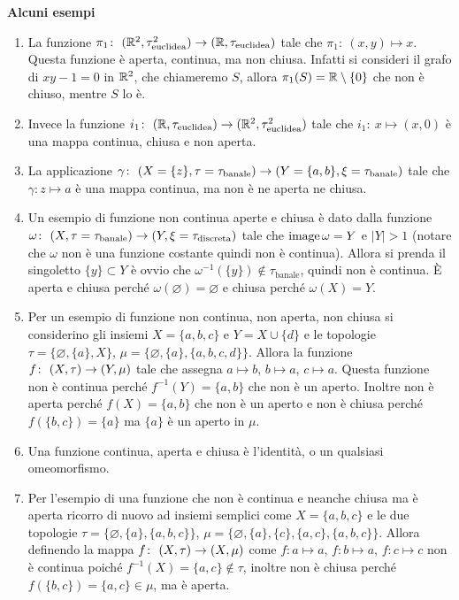 \textbf{Alcuni esempi}
\begin{enumerate}
	\item La funzione $\pi_1 \colon\ (\mathbb{R}^2,\tau^2_{\text{euclidea}}) \rightarrow (\mathbb{R},\tau_{\text{euclidea}})$ tale che $\pi_1 \colon\ (x,y) \mapsto x$. Questa funzione è aperta, continua, ma non chiusa. Infatti si consideri il grafo di $xy - 1 = 0$ in $\mathbb{R}^2$, che chiameremo $S$, allora $\pi_1(S) = \mathbb{R} \setminus \{0\}$ che non è chiuso, mentre $S$ lo è.
	\item Invece la funzione $i_1 \colon\ (\mathbb{R},\tau_{\text{euclidea}}) \rightarrow (\mathbb{R}^2,\tau^2_{\text{euclidea}})$ tale che $i_1 \colon\ x \mapsto (x,0)$ è una mappa continua, chiusa e non aperta. 
	\item La applicazione $\gamma \colon\ (X = \{z\},\tau =\tau_{\text{banale}}) \rightarrow (Y = \{a,b\},\xi = \tau_{\text{banale}})$ tale che  $\gamma \colon z \mapsto a$ è una mappa continua, ma non è ne aperta ne chiusa.
	\item Un esempio di funzione non continua aperte e chiusa è dato dalla funzione $\omega \colon\ (X,\tau =\tau_{\text{banale}}) \rightarrow (Y,\xi = \tau_{\text{discreta}})$ tale che $\operatorname{image}{\omega} = Y$ e $|Y| > 1$ (notare che $\omega$ non è una funzione costante quindi non è continua). Allora si prenda il singoletto $\{y\} \subset Y$ è ovvio che $\omega^{-1}(\{y\}) \notin \tau_{\text{banale}}$, quindi non è continua. È aperta e chiusa perché $\omega(\varnothing) = \varnothing$ e chiusa perché $\omega(X) = Y$.
	\item Per un esempio di funzione non continua, non aperta, non chiusa si considerino gli insiemi $X = \{a,b,c\}$ e $Y = X \cup \{d\}$ e le topologie $\tau = \{\varnothing, \{a\}, X\}$, $\mu = \{ \varnothing, \{a\}, \{a,b,c,d\}\}$. Allora la funzione $f \colon\ (X,\tau) \rightarrow (Y,\mu)$ tale che assegna $a \mapsto b$, $b \mapsto a$, $c \mapsto a$. Questa funzione non è continua perché $f^{-1}(Y) = \{a,b\}$ che non è un aperto. Inoltre non è aperta perché $f(X) = \{a,b\}$ che non è un aperto e non è chiusa perché $f(\{b,c\}) = \{a\}$ ma $\{a\}$ è un aperto in $\mu$.
	\item Una funzione continua, aperta e chiusa è l'identità, o un qualsiasi omeomorfismo.
	\item Per l'esempio di una funzione che non è continua e neanche chiusa ma è aperta ricorro di nuovo ad insiemi semplici come $X = \{a,b,c\}$ e le due topologie $\tau = \{\varnothing, \{a\},\{a,b,c\}\}$, $\mu = \{\varnothing, \{a\}, \{c\}, \{a,c\}, \{a,b,c\}\}$. Allora definendo la mappa $f \colon\ (X,\tau) \rightarrow (X,\mu)$ come $f \colon a \mapsto a$, $f \colon b \mapsto a$, $f \colon c \mapsto c$ non è continua poiché $f^{-1}(X) = \{a,c\} \notin \tau$, inoltre non è chiusa perché $f(\{b,c\}) = \{a,c\} \in \mu$, ma è aperta.\\

\end{enumerate}
